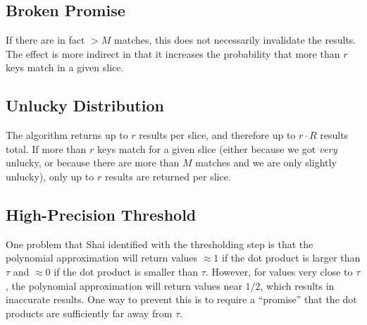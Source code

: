 \documentclass{article}
\begin{document}
	\subsection{Broken Promise}
	If there are in fact $>M$ matches, this does not necessarily invalidate the results. The effect is more indirect in that it increases the probability that more than $r$ keys match in a given slice.
	
	\subsection{Unlucky Distribution}
	The algorithm returns up to $r$ results per slice, and therefore up to $r\cdot R$ results total. If more than $r$ keys match for a given slice (either because we got \emph{very} unlucky, or because there are more than $M$ matches and we are only slightly unlucky), only up to $r$ results are returned per slice.
	
	\subsection{High-Precision Threshold} 
	One problem that Shai identified with the thresholding step is that the polynomial approximation will return values $\approx 1$ if the dot product is larger than $\tau$ and $\approx 0$ if the dot product is smaller than $\tau$. However, for values very close to $\tau$, the polynomial approximation will return values near $1/2$, which results in inaccurate results. One way to prevent this is to require a ``promise'' that the dot products are sufficiently far away from $\tau$. 
\end{document}
